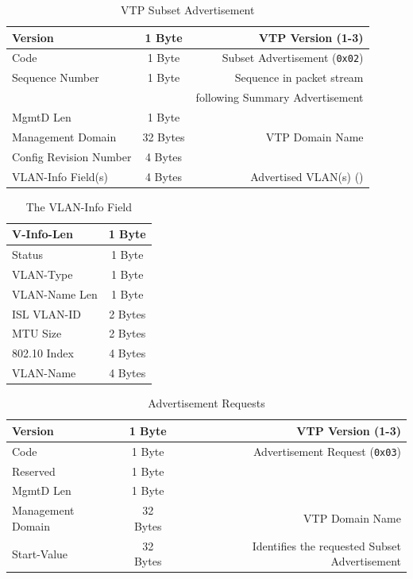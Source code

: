 \documentclass[12pt]{article}
\begin{document}
	\begin{table}[H]
	\centering
	\caption{VTP Subset Advertisement \label{tab:VTP SUBSET}}
	\begin{tabular}{| l | c | r |}
	\hline
	Version				& 1 Byte	& VTP Version (1-3)\\\hline
	Code					& 1 Byte	& Subset Advertisement (\texttt{0x02})\\\hline
	Sequence Number		& 1 Byte	& Sequence in packet stream\\
						&		& following Summary Advertisement\\\hline
	MgmtD Len				& 1 Byte	&\\\hline
	Management Domain		& 32 Bytes	& VTP Domain Name\\\hline
	Config Revision Number	& 4 Bytes	&\\\hline
	VLAN-Info Field(s)		& 4 Bytes	& Advertised VLAN(s) (\Cref{tab:VTP VLAN})\\\hline
	\end{tabular}\end{table}

	\begin{table}[H]
	\centering
	\caption{The VLAN-Info Field \label{tab:VTP VLAN}}
	\begin{tabular}{| l | c |}
	\hline
	V-Info-Len				& 1 Byte\\\hline
	Status				& 1 Byte\\\hline
	VLAN-Type				& 1 Byte\\\hline
	VLAN-Name Len			& 1 Byte\\\hline
	ISL VLAN-ID			& 2 Bytes\\\hline
	MTU Size				& 2 Bytes\\\hline
	802.10 Index			& 4 Bytes\\\hline
	VLAN-Name			& 4 Bytes\\\hline
	\end{tabular}\end{table}

	\begin{table}[H]
	\centering
	\caption{Advertisement Requests \label{tab:VTP REQUEST}}
	\begin{tabular}{| l | c | r |}
	\hline
	Version				& 1 Byte	& VTP Version (1-3)\\\hline
	Code					& 1 Byte	& Advertisement Request (\texttt{0x03})\\\hline
	Reserved				& 1 Byte	&\\\hline
	MgmtD Len				& 1 Byte	&\\\hline
	Management Domain		& 32 Bytes	& VTP Domain Name\\\hline
	Start-Value				& 32 Bytes	& Identifies the requested Subset Advertisement\\\hline
	\end{tabular}\end{table}
\end{document}
